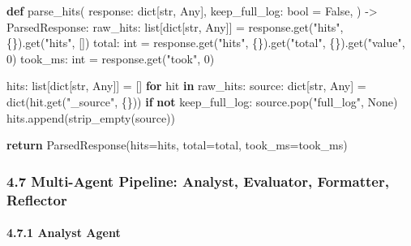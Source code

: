 \documentclass[
]{article}
\newenvironment{Shaded}{}{}
\newcommand{\BuiltInTok}[1]{\textcolor[rgb]{0.00,0.50,0.00}{#1}}
\newcommand{\ControlFlowTok}[1]{\textcolor[rgb]{0.00,0.44,0.13}{\textbf{#1}}}
\newcommand{\DecValTok}[1]{\textcolor[rgb]{0.25,0.63,0.44}{#1}}
\newcommand{\KeywordTok}[1]{\textcolor[rgb]{0.00,0.44,0.13}{\textbf{#1}}}
\newcommand{\NormalTok}[1]{#1}
\newcommand{\OperatorTok}[1]{\textcolor[rgb]{0.40,0.40,0.40}{#1}}
\newcommand{\StringTok}[1]{\textcolor[rgb]{0.25,0.44,0.63}{#1}}
\newcommand{\VariableTok}[1]{\textcolor[rgb]{0.10,0.09,0.49}{#1}}
\begin{document}
\begin{Shaded}
\begin{Highlighting}[]
\KeywordTok{def}\NormalTok{ parse\_hits(}
\NormalTok{    response: }\BuiltInTok{dict}\NormalTok{[}\BuiltInTok{str}\NormalTok{, Any],}
\NormalTok{    keep\_full\_log: }\BuiltInTok{bool} \OperatorTok{=} \VariableTok{False}\NormalTok{,}
\NormalTok{) }\OperatorTok{{-}\textgreater{}}\NormalTok{ ParsedResponse:}
\NormalTok{    raw\_hits: }\BuiltInTok{list}\NormalTok{[}\BuiltInTok{dict}\NormalTok{[}\BuiltInTok{str}\NormalTok{, Any]] }\OperatorTok{=}\NormalTok{ response.get(}\StringTok{"hits"}\NormalTok{, \{\}).get(}\StringTok{"hits"}\NormalTok{, [])}
\NormalTok{    total: }\BuiltInTok{int} \OperatorTok{=}\NormalTok{ response.get(}\StringTok{"hits"}\NormalTok{, \{\}).get(}\StringTok{"total"}\NormalTok{, \{\}).get(}\StringTok{"value"}\NormalTok{, }\DecValTok{0}\NormalTok{)}
\NormalTok{    took\_ms: }\BuiltInTok{int} \OperatorTok{=}\NormalTok{ response.get(}\StringTok{"took"}\NormalTok{, }\DecValTok{0}\NormalTok{)}

\NormalTok{    hits: }\BuiltInTok{list}\NormalTok{[}\BuiltInTok{dict}\NormalTok{[}\BuiltInTok{str}\NormalTok{, Any]] }\OperatorTok{=}\NormalTok{ []}
    \ControlFlowTok{for}\NormalTok{ hit }\KeywordTok{in}\NormalTok{ raw\_hits:}
\NormalTok{        source: }\BuiltInTok{dict}\NormalTok{[}\BuiltInTok{str}\NormalTok{, Any] }\OperatorTok{=} \BuiltInTok{dict}\NormalTok{(hit.get(}\StringTok{"\_source"}\NormalTok{, \{\}))}
        \ControlFlowTok{if} \KeywordTok{not}\NormalTok{ keep\_full\_log:}
\NormalTok{            source.pop(}\StringTok{"full\_log"}\NormalTok{, }\VariableTok{None}\NormalTok{)}
\NormalTok{        hits.append(strip\_empty(source))}

    \ControlFlowTok{return}\NormalTok{ ParsedResponse(hits}\OperatorTok{=}\NormalTok{hits, total}\OperatorTok{=}\NormalTok{total, took\_ms}\OperatorTok{=}\NormalTok{took\_ms)}
\end{Highlighting}
\end{Shaded}

\subsubsection{4.7 Multi-Agent Pipeline: Analyst, Evaluator, Formatter,
Reflector}\label{multi-agent-pipeline-analyst-evaluator-formatter-reflector}

\paragraph{4.7.1 Analyst Agent}\label{analyst-agent}
\end{document}

